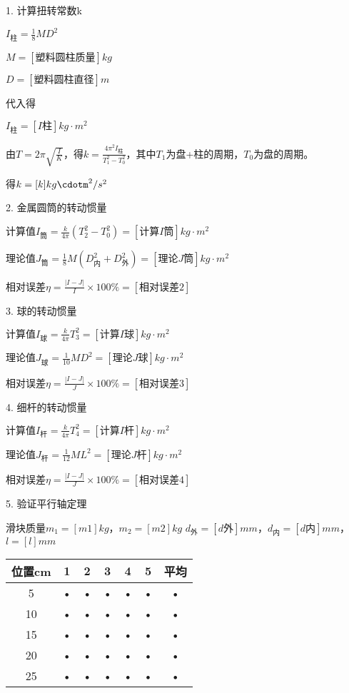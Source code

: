 \documentclass[11pt,a4paper,oneside]{article}
\begin{document}
1. 计算扭转常数k

$I_柱 = \displaystyle\frac{1}{8}MD^2$

$M = [塑料圆柱质量]kg$

$D = [塑料圆柱直径]m$

代入得

$I_柱 = [I柱]kg \cdot m^2$

由$T = 2\pi \sqrt{\displaystyle\frac{I}{K}}$，得$k = \displaystyle\frac{4\pi ^2I_柱}{T_1^2-T_0^2}$，其中$T_1$为盘+柱的周期，$T_0$为盘的周期。

得$k = [k]kg\cdotm^2/s^2$

2. 金属圆筒的转动惯量

$计算值I_筒 = \displaystyle\frac{k}{4\pi }(T_2^2-T_0^2) = [计算I筒]kg\cdot m^2$

$理论值J_筒 = \displaystyle\frac{1}{8}M(D_内^2+D_外^2) = [理论J筒]kg\cdot m^2$

$相对误差 \eta =\displaystyle\frac{\left | I-J \right |}{I}\times 100\% = [相对误差2]$

3. 球的转动惯量

$计算值I_球 = \displaystyle\frac{k}{4\pi }T_3^2 = [计算I球]kg\cdot m^2$

$理论值J_球 = \displaystyle\frac{1}{10}MD^2 = [理论J球]kg\cdot m^2$

$相对误差 \eta =\displaystyle\frac{\left | I-J \right |}{J}\times 100\% = [相对误差3]$

4. 细杆的转动惯量

$计算值I_杆 = \displaystyle\frac{k}{4\pi }T_4^2 = [计算I杆]kg\cdot m^2$

$理论值J_杆 = \displaystyle\frac{1}{12}ML^2 = [理论J杆]kg\cdot m^2$

$相对误差 \eta =\displaystyle\frac{\left | I-J \right |}{J}\times 100\% = [相对误差4]$

5. 验证平行轴定理

滑块质量$m_1 = [m1]kg$，$m_2 = [m2]kg$
$d_外 = [d外]mm$，$d_内= [d内]mm$，$l = [l]mm$

\begin{tabular}{|c|c|c|c|c|c|c|}
\hline 
位置cm & 1 & 2 & 3 & 4 & 5 & 平均 \\ 
\hline 
5 & • & • & • & • & • & • \\ 
\hline 
10 & • & • & • & • & • & • \\ 
\hline 
15 & • & • & • & • & • & • \\ 
\hline 
20 & • & • & • & • & • & • \\ 
\hline 
25 & • & • & • & • & • & • \\ 
\hline 
\end{tabular} 
\end{document}
